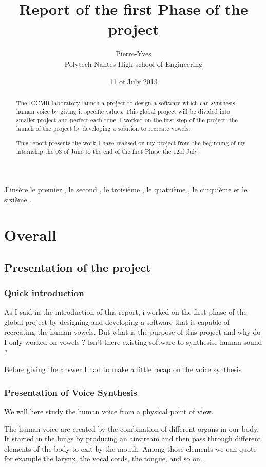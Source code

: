 \documentclass[12pt]{report}
\title{Report of the first Phase of the project}
\author{Pierre-Yves \bsc{Hervo} \\Polytech Nantes High school of Engineering }
\date{11\up{th} of July 2013}
\begin{document}
\maketitle

\begin{abstract}

The ICCMR laboratory launch a project to design a software which can synthesis human voice by giving it specific values. This global project will be divided into smaller project and perfect each time. I worked on the first step of the project: the launch of the project by developing a solution to recreate vowels. 

This report presents the work I have realised on my project from the beginning of my internship the 03 of June to the end of the first Phase the 12of July.

\end{abstract}
  
\tableofcontents

J'insère le premier \cite{ref}, le second \cite{ref2}, le troisième \cite{ref3}, le quatrième \cite{ref4}, le cinquième \cite{ref5} et le sixième \cite{ref6}.


\part{Overall}
\chapter{Presentation of the project}
\section{Quick introduction}
As I said in the introduction of this report, i worked on the first phase of the global project by designing and developing a software that is capable of recreating the human vowels.
But what is the purpose of this project and why do I only worked on vowels ?
Isn't there existing software to synthesise human sound ?

Before giving the answer I had to make a little recap on the voice synthesis
 
\section{Presentation of Voice Synthesis}
We will here study the human voice from a physical point of view.

The human voice are created by the combination of different organs in our body.
It started in the lungs by producing an airstream and then pass through different elements of the body to exit by the mouth. Among those elements we can quote for example the larynx, the vocal cords, the tongue, and so on...
\end{document}
